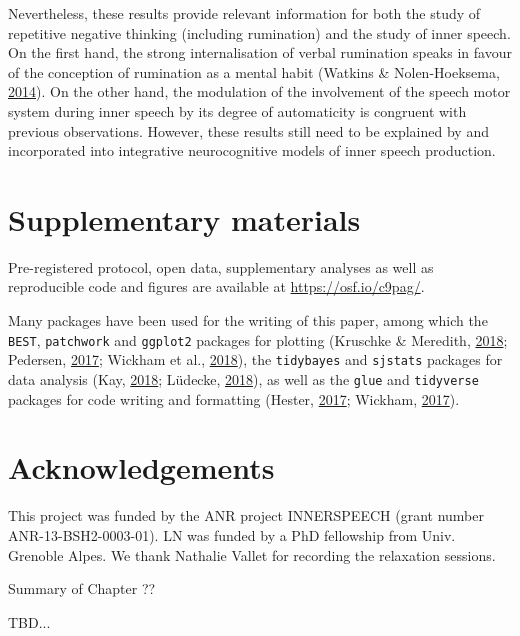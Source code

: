 \documentclass[a4paper,12pt,twoside,openright,oldfontcommands,final]{memoir}
\newcommand\getcurrentref[1]{
 \ifnumequal{\value{#1}}{0}
  {??}
  {\the\value{#1}}
}
\begin{document}
Nevertheless, these results provide relevant information for both the study of repetitive negative thinking (including rumination) and the study of inner speech. On the first hand, the strong internalisation of verbal rumination speaks in favour of the conception of rumination as a mental habit (Watkins \& Nolen-Hoeksema, \protect\hyperlink{ref-watkins_habit-goal_2014}{2014}). On the other hand, the modulation of the involvement of the speech motor system during inner speech by its degree of automaticity is congruent with previous observations. However, these results still need to be explained by and incorporated into integrative neurocognitive models of inner speech production.

\hypertarget{suppCh4}{%
\section{Supplementary materials}\label{suppCh4}}

Pre-registered protocol, open data, supplementary analyses as well as reproducible code and figures are available at \url{https://osf.io/c9pag/}.

Many packages have been used for the writing of this paper, among which the \texttt{BEST}, \texttt{patchwork} and \texttt{ggplot2} packages for plotting (Kruschke \& Meredith, \protect\hyperlink{ref-R-BEST}{2018}; Pedersen, \protect\hyperlink{ref-R-patchwork}{2017}; Wickham et al., \protect\hyperlink{ref-R-ggplot2}{2018}), the \texttt{tidybayes} and \texttt{sjstats} packages for data analysis (Kay, \protect\hyperlink{ref-R-tidybayes}{2018}; Lüdecke, \protect\hyperlink{ref-R-sjstats}{2018}), as well as the \texttt{glue} and \texttt{tidyverse} packages for code writing and formatting (Hester, \protect\hyperlink{ref-R-glue}{2017}; Wickham, \protect\hyperlink{ref-R-tidyverse}{2017}).

\hypertarget{acknowledgements-1}{%
\section{Acknowledgements}\label{acknowledgements-1}}

This project was funded by the ANR project INNERSPEECH (grant number ANR-13-BSH2-0003-01). LN was funded by a PhD fellowship from Univ. Grenoble Alpes. We thank Nathalie Vallet for recording the relaxation sessions.

\newpage

\begin{vplace}[1]

\begin{summary}{Summary of Chapter\getcurrentref{chapter}}

TBD...

\end{summary}

\end{vplace}
\end{document}
